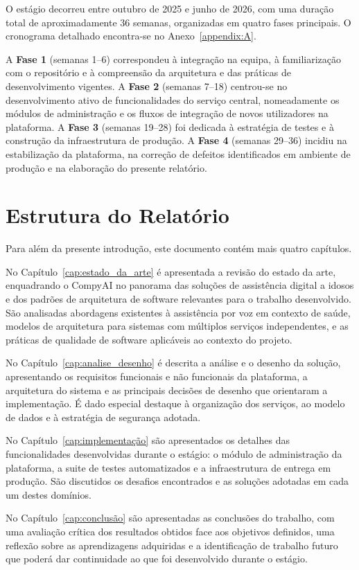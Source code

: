 O estágio decorreu entre outubro de 2025 e junho de 2026, com uma duração total de
aproximadamente 36 semanas, organizadas em quatro fases principais. O cronograma detalhado
encontra-se no Anexo~\ref{appendix:A}.

A \textbf{Fase 1} (semanas 1–6) correspondeu à integração na equipa, à familiarização com o
repositório e à compreensão da arquitetura e das práticas de desenvolvimento vigentes.
A \textbf{Fase 2} (semanas 7–18) centrou-se no desenvolvimento ativo de funcionalidades do
serviço central, nomeadamente os módulos de administração e os fluxos de integração de novos
utilizadores na plataforma.
A \textbf{Fase 3} (semanas 19–28) foi dedicada à estratégia de testes e à construção da
infraestrutura de produção.
A \textbf{Fase 4} (semanas 29–36) incidiu na estabilização da plataforma, na correção de
defeitos identificados em ambiente de produção e na elaboração do presente relatório.

\section{Estrutura do Relatório}
\label{sec:estrutura}

Para além da presente introdução, este documento contém mais quatro capítulos.

No Capítulo~\ref{cap:estado_da_arte} é apresentada a revisão do estado da arte,
enquadrando o CompyAI no panorama das soluções de assistência digital a idosos e dos padrões
de arquitetura de software relevantes para o trabalho desenvolvido. São analisadas abordagens
existentes à assistência por voz em contexto de saúde, modelos de arquitetura para sistemas
com múltiplos serviços independentes, e as práticas de qualidade de software aplicáveis ao
contexto do projeto.

No Capítulo~\ref{cap:analise_desenho} é descrita a análise e o desenho da solução,
apresentando os requisitos funcionais e não funcionais da plataforma, a arquitetura do sistema
e as principais decisões de desenho que orientaram a implementação. É dado especial destaque
à organização dos serviços, ao modelo de dados e à estratégia de segurança adotada.

No Capítulo~\ref{cap:implementação} são apresentados os detalhes das funcionalidades
desenvolvidas durante o estágio: o módulo de administração da plataforma, a suite de testes
automatizados e a infraestrutura de entrega em produção. São discutidos os desafios encontrados
e as soluções adotadas em cada um destes domínios.

No Capítulo~\ref{cap:conclusão} são apresentadas as conclusões do trabalho, com uma avaliação
crítica dos resultados obtidos face aos objetivos definidos, uma reflexão sobre as
aprendizagens adquiridas e a identificação de trabalho futuro que poderá dar continuidade ao
que foi desenvolvido durante o estágio.

